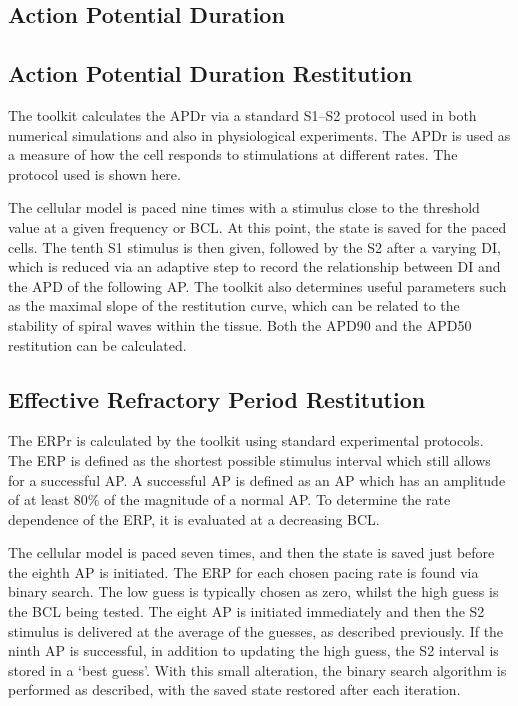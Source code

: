 \subsection{Action Potential Duration}

\subsection{Action Potential Duration Restitution}

The toolkit calculates the APDr via a standard S1--S2 protocol used in both
numerical simulations and also in physiological experiments.  The APDr is used
as a measure of how the cell responds to stimulations at different rates.  The
protocol used is shown here.


The cellular model is paced nine times with a stimulus close to the threshold
value at a given frequency or BCL.  At this point, the state is saved for the
paced cells.  The tenth S1 stimulus is then given, followed by the S2 after a
varying DI, which is reduced via an adaptive step to record the relationship
between DI and the APD of the following AP.  The toolkit also determines useful
parameters such as the maximal slope of the restitution curve, which can be
related to the stability of spiral waves within the tissue.  Both the APD90 and
the APD50 restitution can be calculated.

\subsection{Effective Refractory Period Restitution}

The ERPr is calculated by the toolkit using standard experimental protocols.
The ERP is defined as the shortest possible stimulus interval which still allows
for a successful AP.  A successful AP is defined as an AP which has an amplitude
of at least 80\% of the magnitude of a normal AP.  To determine the rate
dependence of the ERP, it is evaluated at a decreasing BCL.


The cellular model is paced seven times, and then the state is saved just before
the eighth AP is initiated.  The ERP for each chosen pacing rate is found via
binary search.  The low guess is typically chosen as zero, whilst the high guess
is the BCL being tested.  The eight AP is initiated immediately and then the S2
stimulus is delivered at the average of the guesses, as described previously.
If the ninth AP is successful, in addition to updating the high guess, the S2
interval is stored in a `best guess'.  With this small alteration, the binary
search algorithm is performed as described, with the saved state restored after
each iteration.

